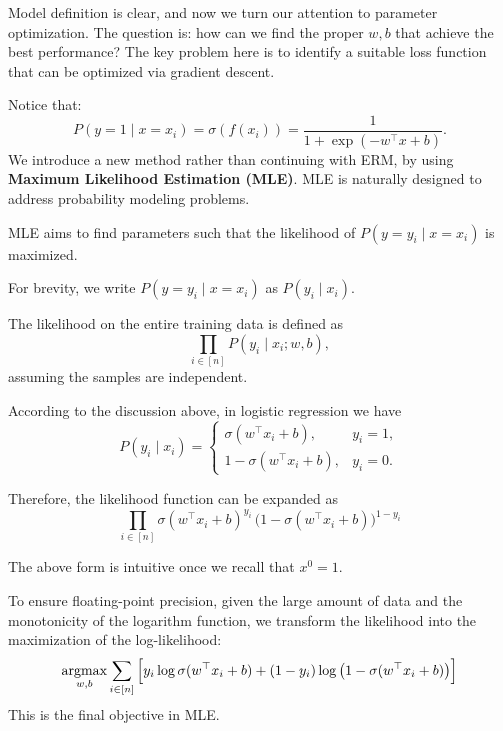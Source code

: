 \documentclass[../main]{subfiles}
\begin{document}
Model definition is clear, and now we turn our attention to parameter optimization. 
The question is: how can we find the proper $w, b$ that achieve the best performance? 
The key problem here is to identify a suitable loss function that can be optimized via gradient descent.

Notice that:
\begin{equation}
    P(y=1 \mid x = x_i) = \sigma(f(x_i)) = \frac{1}{1+\exp(-w^\top x + b)} .
\end{equation}
We introduce a new method rather than continuing with ERM, by using \textbf{Maximum Likelihood Estimation (MLE)}. 
MLE is naturally designed to address probability modeling problems.

\begin{definition}
    MLE aims to find parameters such that the likelihood of $P(y=y_i \mid x=x_i)$ is maximized.
\end{definition}

\begin{remark}
  For brevity, we write $P(y=y_i \mid x=x_i)$ as $P(y_i \mid x_i)$.
\end{remark}
\begin{definition}[Likelihood]
  The likelihood on the entire training data is defined as
  \begin{equation}
      \prod_{i \in [n]} P(y_i \mid x_i; w, b),
  \end{equation}
  assuming the samples are independent.
\end{definition}

According to the discussion above, in logistic regression we have
\begin{equation}
    P(y_i \mid x_i) =
    \begin{cases}
      \sigma(w^\top x_i + b), & y_i = 1, \\
      1 - \sigma(w^\top x_i + b), & y_i = 0.
    \end{cases}
\end{equation}

Therefore, the likelihood function can be expanded as
\begin{equation}
  \prod_{i \in [n]} \sigma(w^\top x_i + b)^{y_i} \,
  \big(1 - \sigma(w^\top x_i + b)\big)^{1-y_i}
\end{equation}

The above form is intuitive once we recall that $x^0 = 1$.

To ensure floating-point precision, given the large amount of data and the monotonicity of the logarithm function, 
we transform the likelihood into the maximization of the log-likelihood:
\begin{equation}
    \mathop{\mathrm{argmax}}_{w,b} \sum_{i \in [n]} 
    \Big[ y_i \log \sigma(w^\top x_i + b) 
    + (1-y_i) \log \big(1 - \sigma(w^\top x_i + b)\big) \Big]
\end{equation}
This is the final objective in MLE.
\end{document}
